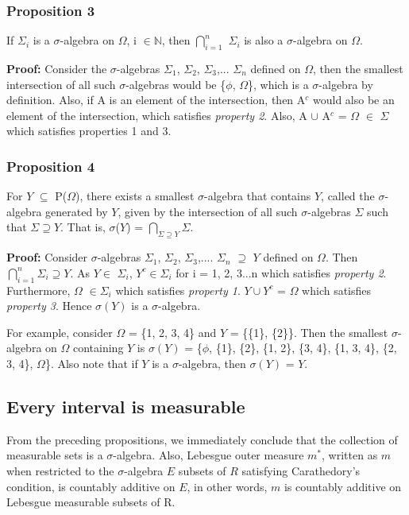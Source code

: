 \documentclass{article}
\begin{document}
\subsubsection{Proposition 3}
If $\Sigma_i$ is a $\sigma$-algebra on $\Omega$, i $\in \mathbb{N}$, then $\bigcap\limits_{i=1}^n$ $\Sigma_i$ is also a $\sigma$-algebra on $\Omega$.

\textbf{Proof: }Consider the $\sigma$-algebras $\Sigma_1$, $\Sigma_2$, $\Sigma_3$,... $\Sigma_n$ defined on $\Omega$, then the smallest intersection of all such $\sigma$-algebras would be \{$\phi$, $\Omega$\}, which is a $\sigma$-algebra by definition. Also, if A is an element of the intersection, then A$^c$ would also be an element of the intersection, which satisfies \textit{property 2}. Also, A $\cup$ A$^c$ = $\Omega$ $\in$ $\Sigma$ which satisfies properties 1 and 3.



\subsubsection{Proposition 4}
For $Y$ $\subseteq$ P($\Omega$), there exists a smallest $\sigma$-algebra that contains $Y$, called the $\sigma$-algebra generated by $Y$, given by the intersection of all such $\sigma$-algebras $\Sigma$ such that $\Sigma \supseteq Y$. That is, $\sigma$($Y$) = $\bigcap\limits_{\Sigma \supseteq Y}\Sigma$.

\textbf{Proof: }Consider $\sigma$-algebras $\Sigma_1$, $\Sigma_2$, $\Sigma_3$,....  $\Sigma_n$ $\supseteq $ $Y$ defined on $\Omega$. Then $\bigcap\limits_{i=1}^n \Sigma_i \supseteq Y$. As $Y \in$ $\Sigma_i$, $Y^c \in \Sigma_i$ for i = 1, 2, 3...n which satisfies \textit{property 2}. Furthermore, $\Omega$ $\in \Sigma_i$ which satisfies \textit{property 1}. $Y \cup Y^c$ = $\Omega$ which satisfies \textit{property 3}. Hence $\sigma(Y)$ is a $\sigma$-algebra.

For example, consider $\Omega$ = \{1, 2, 3, 4\} and $Y$ = \{\{1\}, \{2\}\}. Then the smallest $\sigma$-algebra on $\Omega$ containing $Y$ is $\sigma(Y)$ = \{$\phi$, \{1\}, \{2\}, \{1, 2\}, \{3, 4\}, \{1, 3, 4\}, \{2, 3, 4\}, $\Omega$\}. Also note that if $Y$ is a $\sigma$-algebra, then $\sigma(Y)$ = $Y$.

\subsection{Every interval is measurable}
From the preceding propositions, we immediately conclude that the collection of measurable sets is a $\sigma$-algebra. Also, Lebesgue outer measure $m^*$, written as $m$ when restricted to the $\sigma$-algebra $E$ subsets of $R$ satisfying Carathedory's condition, is countably additive on $E$, in other words, $m$ is countably additive on Lebesgue measurable subsets of R.
\end{document}
